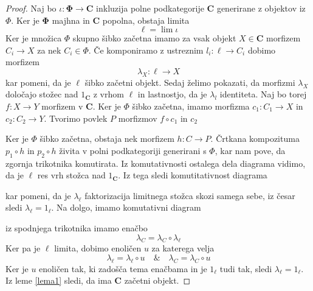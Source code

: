 \documentclass[12pt,a4paper]{book}
\theoremstyle{definition}
\theoremstyle{plain}
\theoremstyle{definition}
\theoremstyle{remark}
\newcommand{\cat}[1]{\textbf{#1}}
\begin{document}
\begin{proof}
Naj bo $\iota : \bm{\Phi} \to \cat{C}$ inkluzija polne podkategorije $\cat{C}$ generirane z objektov iz $\Phi$. Ker je $\bm{\Phi}$ majhna in $\cat{C}$ popolna, obstaja limita
$$\ell = \lim \iota$$
Ker je množica $\Phi$ skupno šibko začetna imamo za vsak objekt $X \in \cat{C}$ morfizem $C_i \to X$ za nek $C_i \in \Phi$. Če komponiramo z ustreznim $l_i : \ell \to C_i$ dobimo morfizem
$$\lambda_X : \ell \to X$$
kar pomeni, da je $\ell$ šibko začetni objekt. Sedaj želimo pokazati, da morfizmi $\lambda_X$ določajo stožec nad $1_\cat{C}$ z vrhom $\ell$ in lastnostjo, da je $\lambda_l$ identiteta. Naj bo torej $f : X \to Y$ morfizem v $\cat{C}$. Ker je $\Phi$ šibko začetna, imamo morfizma $c_1 : C_1 \to X$ in $c_2 : C_2 \to Y$. Tvorimo povlek $P$ morfizmov $f \circ c_1$ in $c_2$
\begin{center}
\end{center}
Ker je $\Phi$ šibko začetna, obstaja nek morfizem $h : C \to P$. Črtkana kompozituma $p_1 \circ h$ in $p_2 \circ h$ živita v polni podkategoriji generirani s $\Phi$, kar nam pove, da zgornja trikotnika komutirata. Iz komutativnosti ostalega dela diagrama vidimo, da je $\ell$ res vrh stožca nad $1_\cat{C}$. Iz tega sledi komutitativnost diagrama
\begin{center}
\end{center}
kar pomeni, da je $\lambda_\ell$ faktorizacija limitnega stožca skozi samega sebe, iz česar sledi $\lambda_\ell = 1_\ell$. Na dolgo, imamo komutativni diagram
\begin{center}
\end{center}
iz spodnjega trikotnika imamo enačbo
$$\lambda_C = \lambda_C \circ \lambda_\ell$$
Ker pa je $\ell$ limita, dobimo enoličen $u$ za katerega velja
$$\lambda_\ell = \lambda_\ell \circ u \quad \& \quad \lambda_C = \lambda_C \circ u$$
Ker je $u$ enoličen tak, ki zadošča tema enačbama in je $1_\ell$ tudi tak, sledi $\lambda_\ell = 1_\ell$. Iz leme \ref{lema1} sledi, da ima $\cat{C}$ začetni objekt.
\end{proof}
\end{document}
